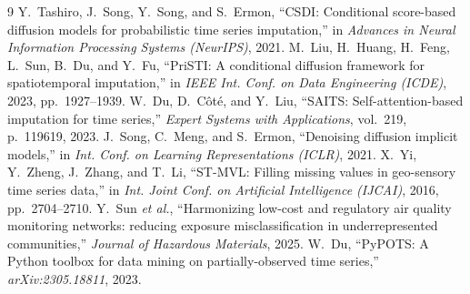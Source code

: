 \documentclass[conference]{IEEEtran}
\begin{document}
\begin{thebibliography}{9}
 Y.~Tashiro, J.~Song, Y.~Song, and S.~Ermon, ``CSDI: Conditional
score-based diffusion models for probabilistic time series imputation,'' in
\emph{Advances in Neural Information Processing Systems (NeurIPS)}, 2021.
 M.~Liu, H.~Huang, H.~Feng, L.~Sun, B.~Du, and Y.~Fu,
``PriSTI: A conditional diffusion framework for spatiotemporal imputation,'' in
\emph{IEEE Int. Conf. on Data Engineering (ICDE)}, 2023, pp.~1927--1939.
 W.~Du, D.~C\^{o}t\'{e}, and Y.~Liu, ``SAITS: Self-attention-based
imputation for time series,'' \emph{Expert Systems with Applications}, vol.~219,
p.~119619, 2023.
 J.~Song, C.~Meng, and S.~Ermon, ``Denoising diffusion implicit
models,'' in \emph{Int. Conf. on Learning Representations (ICLR)}, 2021.
 X.~Yi, Y.~Zheng, J.~Zhang, and T.~Li, ``ST-MVL: Filling missing
values in geo-sensory time series data,'' in \emph{Int. Joint Conf. on
Artificial Intelligence (IJCAI)}, 2016, pp.~2704--2710.
 Y.~Sun \emph{et al.}, ``Harmonizing low-cost and regulatory air
quality monitoring networks: reducing exposure misclassification in
underrepresented communities,'' \emph{Journal of Hazardous Materials}, 2025.
 W.~Du, ``PyPOTS: A Python toolbox for data mining on
partially-observed time series,'' \emph{arXiv:2305.18811}, 2023.
\end{thebibliography}
\end{document}
